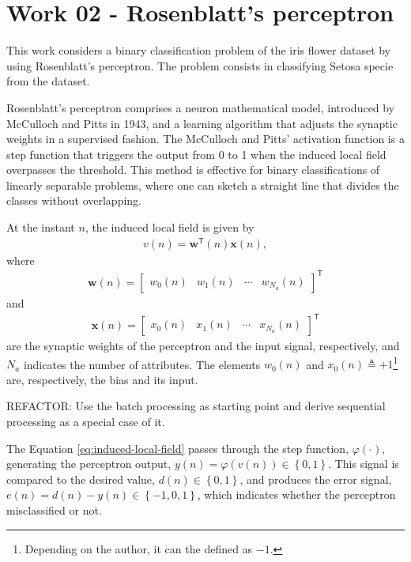 \documentclass[12pt,a4paper]{article}
\newcommand{\trans}{\mathsf{T}}
\begin{document}

\section{Work 02 - Rosenblatt's perceptron}

This work considers a binary classification problem of the iris flower dataset by using Rosenblatt's perceptron. The problem consists in classifying Setosa specie from the dataset.

Rosenblatt's perceptron comprises a neuron mathematical model, introduced by McCulloch and Pitts in 1943, and a learning algorithm that adjusts the synaptic weights in a supervised fashion. The McCulloch and Pitts' activation function is a step function that triggers the output from 0 to 1 when the induced local field overpasses the threshold. This method is effective for binary classifications of linearly separable problems, where one can sketch a straight line that divides the classes without overlapping.

At the instant \(n\), the induced local field is given by
\begin{align}
    v(n) = \mathbf{w}^\trans\left(n\right) \mathbf{x}\left(n\right),
    \label{eq:induced-local-field}
\end{align}
where
\begin{align}
    \mathbf{w}\left(n\right) = \begin{bmatrix}
        w_0(n) & w_1(n) & \cdots & w_{N_a}(n)
    \end{bmatrix}^\trans
\end{align}
and
\begin{align}
    \mathbf{x}\left(n\right) = \begin{bmatrix}
        x_0(n) & x_1(n) & \cdots & x_{N_a}(n)
    \end{bmatrix}^\trans
\end{align}
are the synaptic weights of the perceptron and the input signal, respectively, and \(N_a\) indicates the number of attributes. The elements \(w_0(n)\) and \(x_0(n) \triangleq +1\)\footnote{Depending on the author, it can the defined as \(-1\).} are, respectively, the bias and its input.

REFACTOR: Use the batch processing as starting point and derive sequential processing as a special case of it.

The Equation \eqref{eq:induced-local-field} passes through the step function, \(\varphi \left( \cdot \right)\), generating the perceptron output, \(y\left( n \right) = \varphi(v\left( n \right)) \in \left\{ 0,1 \right\}\). This signal is compared to the desired value, \(d\left( n \right) \in \left\{ 0,1 \right\} \), and produces the error signal, \(e\left( n \right) = d\left( n \right) - y\left( n \right) \in \left\{ -1, 0, 1 \right\}\), which indicates whether the perceptron misclassified or not.
\end{document}
